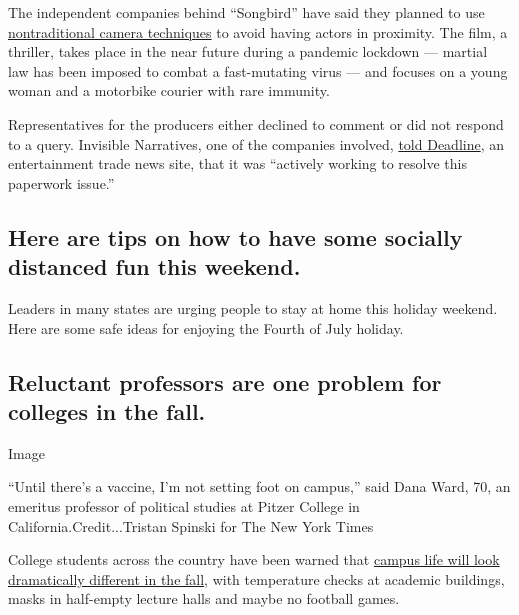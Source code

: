 The independent companies behind ``Songbird'' have said they planned to
use
\href{https://www.hollywoodreporter.com/heat-vision/demi-moore-craig-robinson-board-michael-bay-produced-pandemic-thriller-songbird-1300322}{nontraditional
camera techniques} to avoid having actors in proximity. The film, a
thriller, takes place in the near future during a pandemic lockdown ---
martial law has been imposed to combat a fast-mutating virus --- and
focuses on a young woman and a motorbike courier with rare immunity.

Representatives for the producers either declined to comment or did not
respond to a query. Invisible Narratives, one of the companies involved,
\href{https://deadline.com/2020/07/sag-aftra-songbird-do-not-work-order-los-angeles-shoot-pandemic-1202976458/}{told
Deadline}, an entertainment trade news site, that it was ``actively
working to resolve this paperwork issue.''

\hypertarget{here-are-tips-on-how-to-have-some-socially-distanced-fun-this-weekend}{%
\subsection{Here are tips on how to have some socially distanced fun
this
weekend.}\label{here-are-tips-on-how-to-have-some-socially-distanced-fun-this-weekend}}

Leaders in many states are urging people to stay at home this holiday
weekend. Here are some safe ideas for enjoying the Fourth of July
holiday.

\hypertarget{reluctant-professors-are-one-problem-for-colleges-in-the-fall}{%
\subsection{Reluctant professors are one problem for colleges in the
fall.}\label{reluctant-professors-are-one-problem-for-colleges-in-the-fall}}

Image

``Until there's a vaccine, I'm not setting foot on campus,'' said Dana
Ward, 70, an emeritus professor of political studies at Pitzer College
in California.Credit...Tristan Spinski for The New York Times

College students across the country have been warned that
\href{https://www.nytimes3xbfgragh.onion/2020/06/03/magazine/covid-college-fall.html}{campus
life will look dramatically different in the fall}, with temperature
checks at academic buildings, masks in half-empty lecture halls and
maybe no football games.

